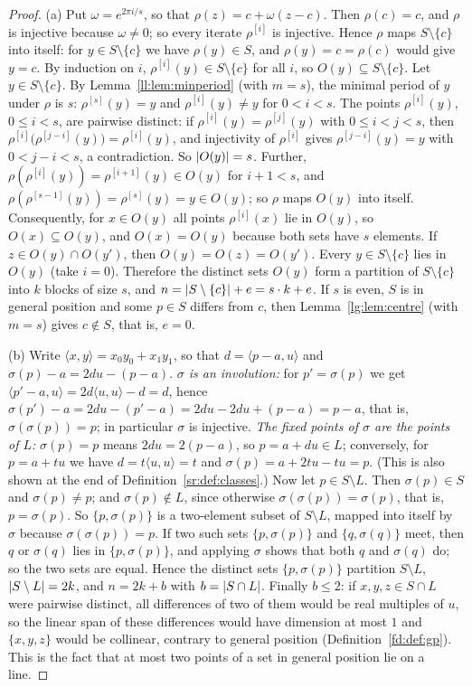 \begin{proof}
(a) Put $\omega=e^{2\pi i/s}$, so that $\rho(z)=c+\omega(z-c)$. Then $\rho(c)=c$, and $\rho$ is injective because
$\omega\ne0$; so every iterate $\rho^{[i]}$ is injective. Hence $\rho$ maps $S\setminus\{c\}$ into itself: for
$y\in S\setminus\{c\}$ we have $\rho(y)\in S$, and $\rho(y)=c=\rho(c)$ would give $y=c$. By induction on $i$,
$\rho^{[i]}(y)\in S\setminus\{c\}$ for all $i$, so $O(y)\subseteq S\setminus\{c\}$. Let $y\in S\setminus\{c\}$. By
Lemma~\ref{ll:lem:minperiod} (with $m=s$), the minimal period of $y$ under $\rho$ is $s$: $\rho^{[s]}(y)=y$ and
$\rho^{[i]}(y)\ne y$ for $0<i<s$. The points $\rho^{[i]}(y)$, $0\le i<s$, are pairwise distinct: if
$\rho^{[i]}(y)=\rho^{[j]}(y)$ with $0\le i<j<s$, then $\rho^{[i]}\bigl(\rho^{[j-i]}(y)\bigr)=\rho^{[i]}(y)$, and
injectivity of $\rho^{[i]}$ gives $\rho^{[j-i]}(y)=y$ with $0<j-i<s$, a contradiction. So $\lvert O(y)\rvert=s$. Further,
$\rho(\rho^{[i]}(y))=\rho^{[i+1]}(y)\in O(y)$ for $i+1<s$, and $\rho(\rho^{[s-1]}(y))=\rho^{[s]}(y)=y\in O(y)$; so
$\rho$ maps $O(y)$ into itself. Consequently, for $x\in O(y)$ all points $\rho^{[i]}(x)$ lie in $O(y)$, so
$O(x)\subseteq O(y)$, and $O(x)=O(y)$ because both sets have $s$ elements. If $z\in O(y)\cap O(y')$, then
$O(y)=O(z)=O(y')$. Every $y\in S\setminus\{c\}$ lies in $O(y)$ (take $i=0$). Therefore the distinct sets $O(y)$ form a
partition of $S\setminus\{c\}$ into $k$ blocks of size $s$, and $n=\lvert S\setminus\{c\}\rvert+e=s\cdot k+e$. If $s$ is
even, $S$ is in general position and some $p\in S$ differs from $c$, then Lemma~\ref{lg:lem:centre} (with $m=s$)
gives $c\notin S$, that is, $e=0$.

(b) Write $\langle x,y\rangle=x_0y_0+x_1y_1$, so that $d=\langle p-a,u\rangle$ and $\sigma(p)-a=2du-(p-a)$.
\emph{$\sigma$ is an involution:} for $p'=\sigma(p)$ we get $\langle p'-a,u\rangle=2d\langle u,u\rangle-d=d$, hence
$\sigma(p')-a=2du-(p'-a)=2du-2du+(p-a)=p-a$, that is, $\sigma(\sigma(p))=p$; in particular $\sigma$ is injective.
\emph{The fixed points of $\sigma$ are the points of $L$:} $\sigma(p)=p$ means $2du=2(p-a)$, so $p=a+du\in L$;
conversely, for $p=a+tu$ we have $d=t\langle u,u\rangle=t$ and $\sigma(p)=a+2tu-tu=p$. (This is also shown at the
end of Definition~\ref{sr:def:classes}.) Now let $p\in S\setminus L$. Then $\sigma(p)\in S$ and $\sigma(p)\ne p$; and
$\sigma(p)\notin L$, since otherwise $\sigma(\sigma(p))=\sigma(p)$, that is, $p=\sigma(p)$. So $\{p,\sigma(p)\}$ is a
two-element subset of $S\setminus L$, mapped into itself by $\sigma$ because $\sigma(\sigma(p))=p$. If two such sets
$\{p,\sigma(p)\}$ and $\{q,\sigma(q)\}$ meet, then $q$ or $\sigma(q)$ lies in $\{p,\sigma(p)\}$, and applying
$\sigma$ shows that both $q$ and $\sigma(q)$ do; so the two sets are equal. Hence the distinct sets $\{p,\sigma(p)\}$
partition $S\setminus L$, $\lvert S\setminus L\rvert=2k$, and $n=2k+b$ with $b=\lvert S\cap L\rvert$. Finally $b\le2$: if
$x,y,z\in S\cap L$ were pairwise distinct, all differences of two of them would be real multiples of $u$, so the
linear span of these differences would have dimension at most $1$ and $\{x,y,z\}$ would be collinear, contrary to
general position (Definition~\ref{fd:def:gp}). This is the fact that at most two points of a set in general position
lie on a line.


\end{proof}
